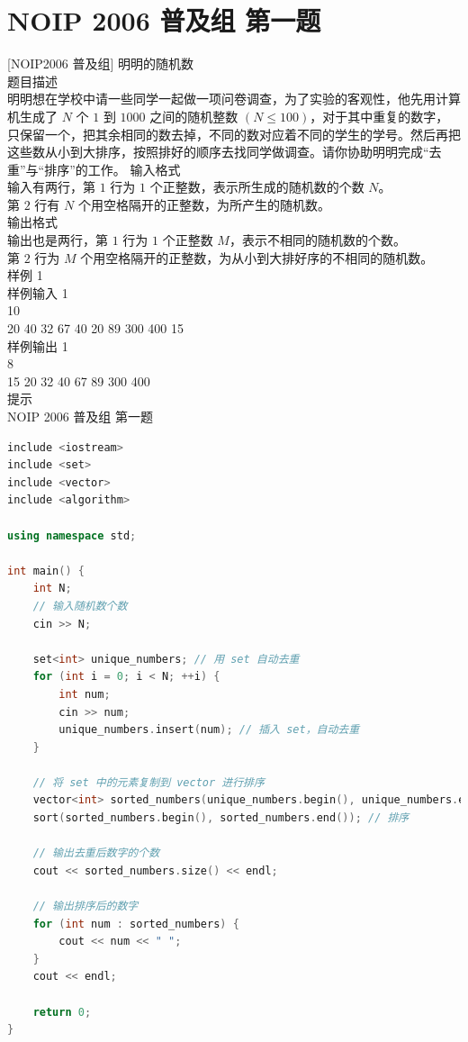 \documentclass[12pt,twiside,a4paper]{ctexbook}
\numberwithin{chapter}{part}
\begin{document}
\section{NOIP 2006 普及组 第一题}
 [NOIP2006 普及组] 明明的随机数\\
 题目描述\\
明明想在学校中请一些同学一起做一项问卷调查，为了实验的客观性，他先用计算机生成了 $N$ 个 $1$ 到 $1000$ 之间的随机整数 $(N\leq100)$，对于其中重复的数字，只保留一个，把其余相同的数去掉，不同的数对应着不同的学生的学号。然后再把这些数从小到大排序，按照排好的顺序去找同学做调查。请你协助明明完成“去重”与“排序”的工作。
 输入格式\\
输入有两行，第 $1$ 行为 $1$ 个正整数，表示所生成的随机数的个数 $N$。\\
第 $2$ 行有 $N$ 个用空格隔开的正整数，为所产生的随机数。\\
 输出格式\\
输出也是两行，第 $1$ 行为 $1$ 个正整数 $M$，表示不相同的随机数的个数。\\
第 $2$ 行为 $M$ 个用空格隔开的正整数，为从小到大排好序的不相同的随机数。\\
 样例 1\\
 样例输入 1\\
10\\
20 40 32 67 40 20 89 300 400 15\\
 样例输出 1\\
8\\
15 20 32 40 67 89 300 400\\
 提示\\
NOIP 2006 普及组 第一题\\
\begin{lstlisting}[language=c++]
include <iostream>
include <set>
include <vector>
include <algorithm>

using namespace std;

int main() {
    int N;
    // 输入随机数个数
    cin >> N;

    set<int> unique_numbers; // 用 set 自动去重
    for (int i = 0; i < N; ++i) {
        int num;
        cin >> num;
        unique_numbers.insert(num); // 插入 set，自动去重
    }

    // 将 set 中的元素复制到 vector 进行排序
    vector<int> sorted_numbers(unique_numbers.begin(), unique_numbers.end());
    sort(sorted_numbers.begin(), sorted_numbers.end()); // 排序

    // 输出去重后数字的个数
    cout << sorted_numbers.size() << endl;

    // 输出排序后的数字
    for (int num : sorted_numbers) {
        cout << num << " ";
    }
    cout << endl;

    return 0;
}
\end{lstlisting}
\end{document}
